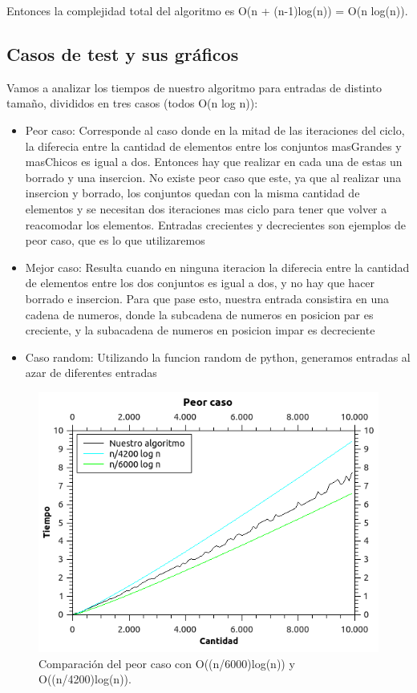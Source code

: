Entonces la complejidad total del algoritmo es O(n + (n-1)log(n)) = O(n log(n)).

\subsection{Casos de test y sus gráficos}
Vamos a analizar los tiempos de nuestro algoritmo para entradas de distinto tamaño, divididos en tres casos (todos O(n log n)):
\begin{itemize}
\item Peor caso: Corresponde al caso donde en la mitad de las iteraciones del ciclo, la diferecia entre la cantidad de elementos entre los conjuntos masGrandes y masChicos es igual a dos. Entonces hay que realizar en cada una de estas un borrado y una insercion. No existe peor caso que este, ya que al realizar una insercion y borrado, los conjuntos quedan con la misma cantidad de elementos y se necesitan dos iteraciones mas ciclo para tener que volver a reacomodar los elementos. Entradas crecientes y decrecientes son ejemplos de peor caso, que es lo que utilizaremos
\item Mejor caso: Resulta cuando en ninguna iteracion la diferecia entre la cantidad de elementos entre los dos conjuntos es igual a dos, y no hay que hacer borrado e insercion. Para que pase esto, nuestra entrada consistira en una cadena de numeros, donde la subcadena de numeros en posicion par es creciente, y la subacadena de numeros en posicion impar es decreciente 
\item Caso random: Utilizando la funcion random de python, generamos entradas al azar de diferentes entradas
\end{itemize}

\begin{figure}[H]
\begin{center}

  \includegraphics[width=\linewidth]{../graficos/ej2/Peor.png}
  \caption{{\small Comparación del peor caso con O((n/6000)log(n)) y O((n/4200)log(n)).}} \label{ej2-peor-caso}
\endminipage

\end{center}
\end{figure}


